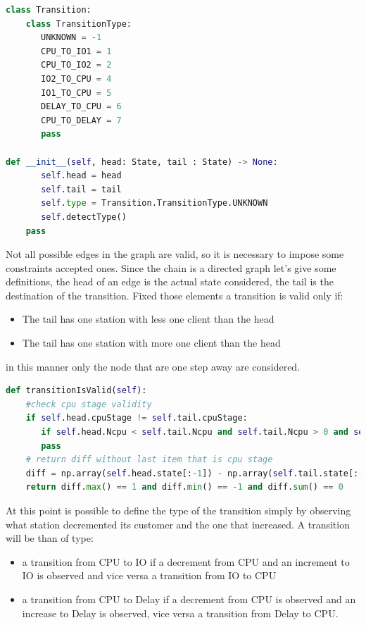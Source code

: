 \documentclass[12pt,a4paper]{article}
\begin{document}
\begin{lstlisting}[language=python]
class Transition:   
    class TransitionType:
       UNKNOWN = -1
       CPU_TO_IO1 = 1
       CPU_TO_IO2 = 2
       IO2_TO_CPU = 4
       IO1_TO_CPU = 5
       DELAY_TO_CPU = 6
       CPU_TO_DELAY = 7
       pass

def __init__(self, head: State, tail : State) -> None:
       self.head = head
       self.tail = tail
       self.type = Transition.TransitionType.UNKNOWN
       self.detectType()
    pass
\end{lstlisting}

Not all possible edges in the graph are valid, so it is necessary to impose some constraints accepted ones. Since the chain is a directed graph let's give some definitions, the head of an edge is the actual state considered, the tail is the destination of the transition. Fixed those elements a transition is valid only if:
\begin{itemize}
    \item The tail has one station with less one client than the head 
    \item The tail has one station with more one client than the head 
\end{itemize}
in this manner only the node that are one step away are considered. 

\begin{lstlisting}[language=python,breaklines]
    def transitionIsValid(self):
    #check cpu stage validity
    if self.head.cpuStage != self.tail.cpuStage:
       if self.head.Ncpu < self.tail.Ncpu and self.tail.Ncpu > 0 and self.head.Ncpu > 0: return False
       pass
    # return diff without last item that is cpu stage
    diff = np.array(self.head.state[:-1]) - np.array(self.tail.state[:-1])
    return diff.max() == 1 and diff.min() == -1 and diff.sum() == 0
\end{lstlisting}

At this point is possible to define the type of the transition simply by observing what station decremented its customer and the one that increased. A transition will be than of type: 

\begin{itemize}
    \item a transition from CPU to IO if a decrement from CPU and an increment to IO is observed and vice versa a transition from IO to CPU 
    \item a transition from CPU to Delay if a decrement from CPU is observed and an increase to Delay is observed, vice versa a transition from Delay to CPU.
\end{itemize}
\end{document}
